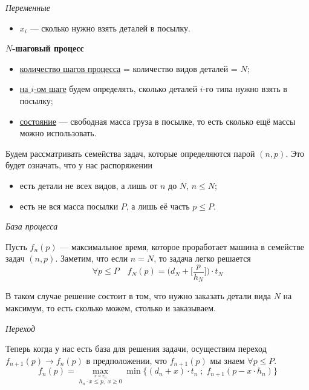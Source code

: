 \bigskip

\textit{Переменные}

\begin{itemize}[nosep]	
	\item $x_i$ --- сколько нужно взять деталей в посылку.
\end{itemize}

\bigskip

\textbf{$N$-шаговый процесс}

\begin{itemize}[nosep]
	\item \underline{количество шагов процесса} = количество видов деталей = $N$;
	
	\item \underline{на $i$-ом шаге} будем определять, сколько деталей $i$-го типа нужно взять в посылку;
	
	\item \underline{состояние} --- свободная масса груза в посылке, то есть сколько ещё массы можно использовать.
\end{itemize}

Будем рассматривать семейства задач, которые определяются парой $(n, p)$. Это будет означать, что у нас распоряжении
\begin{itemize}[nosep]
	\item есть детали не всех видов, а лишь от $n$ до $N$, $n \le N$;
	
	\item есть не вся масса посылки $P$, а лишь её часть $p \le P$.
\end{itemize}

\bigskip

\textit{База процесса}

Пусть $f_n(p)$ --- максимальное время, которое проработает машина в семействе задач $(n, p)$. Заметим, что если $n = N$, то задача легко решается
\[
\forall p \le P \quad f_N(p) = \bigg(d_N + \bigg[\frac{p}{h_N}\bigg]\bigg) \cdot t_N
\]

В таком случае решение состоит в том, что нужно заказать детали вида $N$ на максимум, то есть сколько можем, столько и заказываем.

\bigskip

\textit{Переход}

Теперь когда у нас есть база для решения задачи, осуществим переход $f_{n+1}(p) \to f_n(p)$ в предположении, что $f_{n+1}(p)$ мы знаем $\forall p \le P$.
\[
\boxed{f_n(p) = \max_{\stackrel{x = x_n}{h_n \cdot x \le p, \; x \ge 0}} \min\Big\{(d_n + x) \cdot t_n \; ; \; f_{n+1}(p - x \cdot h_n)\Big\}}
\]

